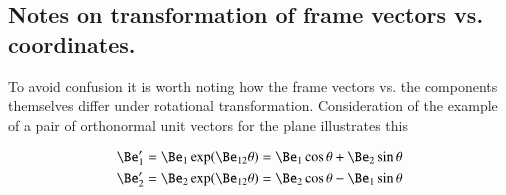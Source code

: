 \documentclass{article}
\newcommand{\phicap}[0]{\hat{\boldsymbol{\phi}}}
\begin{document}

\subsection{ Notes on transformation of frame vectors vs. coordinates. }

To avoid confusion it is worth noting how the frame vectors vs. the components themselves differ under
rotational transformation.  Consideration of the example of a pair of orthonormal unit vectors for the plane illustrates this

\begin{align*}
\Be_1' &= \Be_1 \exp(\Be_{12}\theta) = \Be_1 \cos\theta + \Be_2 \sin\theta \\
\Be_2' &= \Be_2 \exp(\Be_{12}\theta) = \Be_2 \cos\theta - \Be_1 \sin\theta \\
\end{align*}
\end{document}
